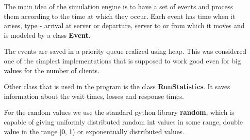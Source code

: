 \documentclass[12pt]{article}
\theoremstyle{plain}
\begin{document}
The main idea of the simulation engine is to have a set of events and process 
them according to the time at which they occur. Each event has time when it
arises, type - arrival at server or departure, server to or from which it moves
and is modeled by a class \textbf{Event}.

The events are saved in a priority queue realized using heap. This was
considered one of the simplest implementations that is supposed to work good 
even for big values for the number of clients.

Other class that is used in the program is the class \textbf{RunStatistics}. It
saves information about the wait times, losses and response times. 

For the random values we use the standard python library \textbf{random}, which
is capable of giving uniformly distributed random int values in some range,
double value in the range [0, 1) or exponentually distributed values.
\end{document}
